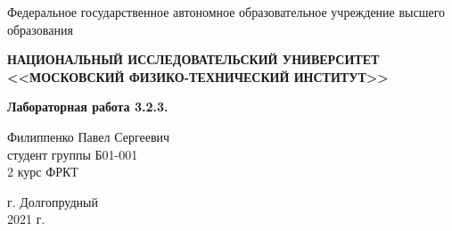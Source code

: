 \begin{center}
    
    \normalsize{Федеральное государственное автономное образовательное учреждение высшего образования}
    
    \textbf{НАЦИОНАЛЬНЫЙ ИССЛЕДОВАТЕЛЬСКИЙ УНИВЕРСИТЕТ \\ <<МОСКОВСКИЙ ФИЗИКО-ТЕХНИЧЕСКИЙ ИНСТИТУТ>>}
    \vspace{13ex}
    
    \textbf{Лабораторная работа 3.2.3.}
    \vspace{40ex}
    
    \normalsize{Филиппенко Павел Сергеевич \\ студент группы Б01-001\\ 2 курс ФРКТ\\}
\end{center}
    
\vfill 
    
\begin{center}
г. Долгопрудный\\ 
2021 г.
\end{center}


\thispagestyle{empty} %
\newpage